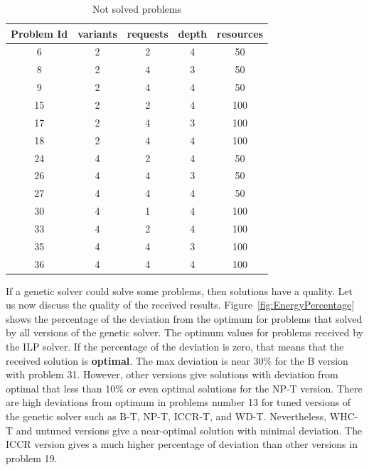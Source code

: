 \begin{table}
	\centering
	\caption{Not solved problems}\label{tab:UnsolvedProblems}
		\begin{tabular}{c c c c c}
			\hline
			Problem Id & variants & requests & depth & resources \\
			\hline            
			6 & 2 & 2 & 4 & 50 \\
			8 & 2 & 4 & 3 & 50 \\
			9 & 2 & 4 & 4 & 50 \\
			15 & 2 & 2 & 4 & 100 \\
			17 & 2 & 4 & 3 & 100 \\
			18 & 2 & 4 & 4 & 100 \\
			24 & 4 & 2 & 4 & 50 \\
			26 & 4 & 4 & 3 & 50 \\
			27 & 4 & 4 & 4 & 50 \\
			30 & 4 & 1 & 4 & 100 \\
			33 & 4 & 2 & 4 & 100 \\
			35 & 4 & 4 & 3 & 100 \\
			36 & 4 & 4 & 4 & 100 \\
			\hline
		\end{tabular}
\end{table}

If a genetic solver could solve some problems, then solutions have a quality.
Let us now discuss the quality of the received results. Figure~\ref{fig:EnergyPercentage} shows the percentage of the deviation from the optimum for problems that solved by all versions of the genetic solver. The optimum values for problems received by the ILP solver. If the percentage of the deviation is zero, that means that the received solution is \textbf{optimal}. The max deviation is near 30\% for the B version with problem 31. However, other versions give solutions with deviation from optimal that less than 10\% or even optimal solutions for the NP-T version. There are high deviations from optimum in problems number 13 for tuned versions of the genetic solver such as B-T, NP-T, ICCR-T, and WD-T. Nevertheless, WHC-T and untuned versions give a near-optimal solution with minimal deviation. The ICCR version gives a much higher percentage of deviation than other versions in problem 19.

